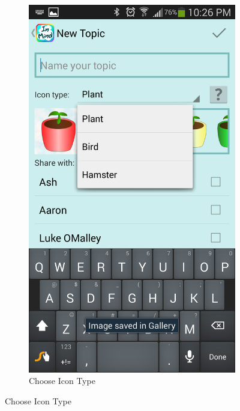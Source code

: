 \begin{figure}
\begin{subfigure}[b]{0.4\textwidth}
      \end{subfigure}
      \begin{subfigure}[b]{0.4\textwidth}
        \includegraphics[width=\textwidth]{topic_create_choose.png}
        \caption{Choose Icon Type}
      \end{subfigure}
      \label{fig:topic_create}
    \end{figure}

